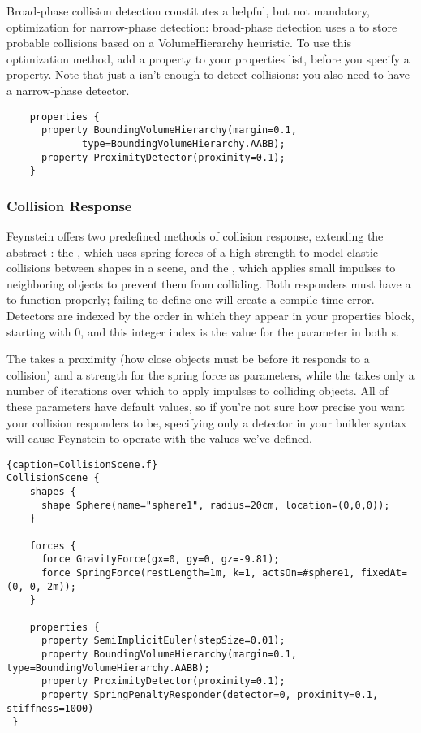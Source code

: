 Broad-phase collision detection constitutes a helpful, but not
mandatory, optimization for narrow-phase detection: broad-phase
detection uses a  to store probable
collisions based on a VolumeHierarchy heuristic. To use this
optimization method, add a  property to
your properties list, before you specify a 
property. Note that just a  isn't enough
to detect collisions: you also need to have a narrow-phase detector.

\begin{lstlisting}
    properties {
      property BoundingVolumeHierarchy(margin=0.1, 
             type=BoundingVolumeHierarchy.AABB);
      property ProximityDetector(proximity=0.1);
    }
\end{lstlisting}

\subsubsection{Collision Response}

Feynstein offers two predefined methods of collision response,
extending the abstract : the
, which uses spring forces of a high
strength to model elastic collisions between shapes in a scene, and
the , which applies small impulses to
neighboring objects to prevent them from colliding. Both responders
must have a  to function properly; failing to
define one will create a compile-time error. Detectors are indexed by
the order in which they appear in your properties block, starting with
0, and this integer index is the value for the 
parameter in both s.

The  takes a proximity (how close objects
must be before it responds to a collision) and a strength for the
spring force as parameters, while the  takes
only a number of iterations over which to apply impulses to colliding
objects. All of these parameters have default values, so if you're not
sure how precise you want your collision responders to be, specifying
only a detector in your builder syntax will cause Feynstein to operate
with the values we've defined.

\begin{lstlisting}{caption=CollisionScene.f}
CollisionScene {
    shapes {
      shape Sphere(name="sphere1", radius=20cm, location=(0,0,0));
    }

    forces {
      force GravityForce(gx=0, gy=0, gz=-9.81);
      force SpringForce(restLength=1m, k=1, actsOn=#sphere1, fixedAt=(0, 0, 2m));
    }

    properties {
      property SemiImplicitEuler(stepSize=0.01);
      property BoundingVolumeHierarchy(margin=0.1, type=BoundingVolumeHierarchy.AABB);
      property ProximityDetector(proximity=0.1);
      property SpringPenaltyResponder(detector=0, proximity=0.1, stiffness=1000)
 }
\end{lstlisting}
